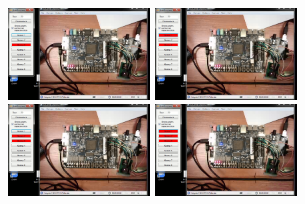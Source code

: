 \documentclass[a4paper]{article}
\begin{document}
\begin{figure}[H]
    \includegraphics[width=0.335\textwidth, angle=90]{02_75}
    \hfill
    \includegraphics[width=0.335\textwidth, angle=90]{02_76}
    \hfill
    \includegraphics[width=0.335\textwidth, angle=90]{02_77}
    \hfill
    \includegraphics[width=0.335\textwidth, angle=90]{02_78}
    \vspace{0.15cm}


\end{figure}
\end{document}
